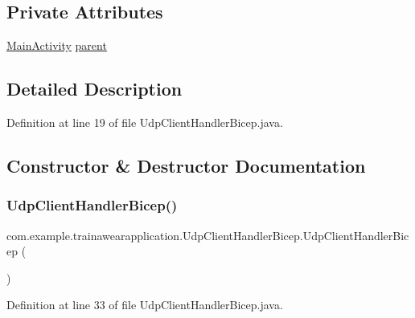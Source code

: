 \subsection*{Private Attributes}
\begin{DoxyCompactItemize}
\item 
\mbox{\hyperlink{classcom_1_1example_1_1trainawearapplication_1_1_main_activity}{Main\+Activity}} \mbox{\hyperlink{classcom_1_1example_1_1trainawearapplication_1_1_udp_client_handler_bicep_a0b203f16a962458064aebb68efbd72bb}{parent}}
\end{DoxyCompactItemize}


\subsection{Detailed Description}


Definition at line 19 of file Udp\+Client\+Handler\+Bicep.\+java.



\subsection{Constructor \& Destructor Documentation}
\mbox{\label{classcom_1_1example_1_1trainawearapplication_1_1_udp_client_handler_bicep_afa5c7cacbf23c1527423e8bf7c22abe1}} 
\subsubsection{\texorpdfstring{UdpClientHandlerBicep()}{UdpClientHandlerBicep()}}
{\footnotesize\ttfamily com.\+example.\+trainawearapplication.\+Udp\+Client\+Handler\+Bicep.\+Udp\+Client\+Handler\+Bicep (\begin{DoxyParamCaption}{ }\end{DoxyParamCaption})\hspace{0.3cm}{\ttfamily [inline]}}



Definition at line 33 of file Udp\+Client\+Handler\+Bicep.\+java.


\begin{DoxyCode}{0}

\end{DoxyCode}


